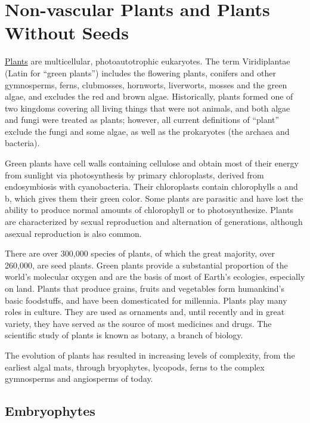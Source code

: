 \chapter{Non-vascular Plants and Plants Without
Seeds}\label{non-vascular-plants-and-plants-without-seeds}

\href{https://en.wikipedia.org/wiki/Plant}{Plants} are multicellular,
photoautotrophic eukaryotes. The term Viridiplantae (Latin for ``green
plants'') includes the flowering plants, conifers and other gymnosperms,
ferns, clubmosses, hornworts, liverworts, mosses and the green algae,
and excludes the red and brown algae. Historically, plants formed one of
two kingdoms covering all living things that were not animals, and both
algae and fungi were treated as plants; however, all current definitions
of ``plant'' exclude the fungi and some algae, as well as the
prokaryotes (the archaea and bacteria).

Green plants have cell walls containing cellulose and obtain most of
their energy from sunlight via photosynthesis by primary chloroplasts,
derived from endosymbiosis with cyanobacteria. Their chloroplasts
contain chlorophylls a and b, which gives them their green color. Some
plants are parasitic and have lost the ability to produce normal amounts
of chlorophyll or to photosynthesize. Plants are characterized by sexual
reproduction and alternation of generations, although asexual
reproduction is also common.

There are over 300,000 species of plants, of which the great majority,
over 260,000, are seed plants. Green plants provide a substantial
proportion of the world's molecular oxygen and are the basis of most of
Earth's ecologies, especially on land. Plants that produce grains,
fruits and vegetables form humankind's basic foodstuffs, and have been
domesticated for millennia. Plants play many roles in culture. They are
used as ornaments and, until recently and in great variety, they have
served as the source of most medicines and drugs. The scientific study
of plants is known as botany, a branch of biology.

The evolution of plants has resulted in increasing levels of complexity,
from the earliest algal mats, through bryophytes, lycopods, ferns to the
complex gymnosperms and angiosperms of today.

\section{Embryophytes}\label{embryophytes}

